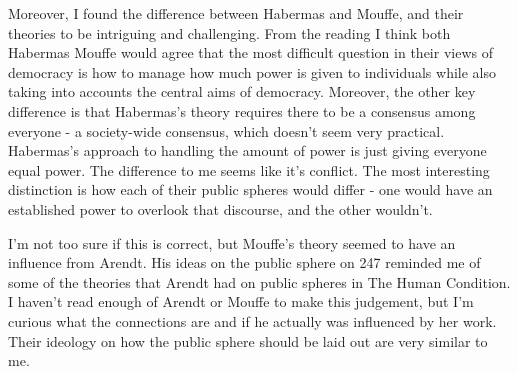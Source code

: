 \documentclass[11pt, oneside]{article}
\begin{document}
\par Moreover, I found the difference between Habermas and Mouffe, and their theories to be intriguing and challenging. From the reading I think both Habermas Mouffe would agree that the most difficult question in their views of democracy is how to manage how much power is given to individuals while also taking into accounts the central aims of democracy. Moreover, the other key difference is that Habermas's theory requires there to be a consensus among everyone - a society-wide consensus, which doesn't seem very practical. Habermas's approach to handling the amount of power is just giving everyone equal power. The difference to me seems like it's conflict. The most interesting distinction is how each of their public spheres would differ - one would have an established power to overlook that discourse, and the other wouldn't.

\par I'm not too sure if this is correct, but Mouffe's theory seemed to have an influence from Arendt. His ideas on the public sphere on 247 reminded me of some of the theories that Arendt had on public spheres in The Human Condition. I haven't read enough of Arendt or Mouffe to make this judgement, but I'm curious what the connections are and if he actually was influenced by her work. Their ideology on how the public sphere should be laid out are very similar to me.
\end{document}
